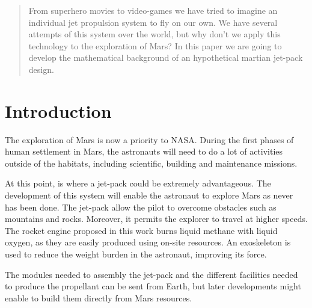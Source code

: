 \documentclass[twocolumn]{article}
\newcommand{\Mark}[1]{\textsuperscript{#1}}
\begin{document}
\clearpage

\thispagestyle{empty}
\phantom{asd}

\clearpage

\setcounter{page}{1}


\begin{abstract}
From superhero movies to video-games we have tried to imagine an individual jet 
propulsion system to fly on our own. We have several attempts of this system 
over the world, but why don't we apply this technology to the exploration of 
Mars? In this paper we are going to develop the mathematical background of an 
hypothetical martian jet-pack design. 
\end{abstract}

\section{Introduction}
The exploration of Mars is now a priority to NASA. During the first phases of 
human settlement in Mars, the astronauts will need to do a lot of activities
outside of the habitats, including scientific, building and maintenance 
missions.

At this point, is where a jet-pack could be extremely advantageous. The 
development of this system will enable the astronaut to explore Mars as never 
has been done. The jet-pack allow the pilot to overcome obstacles such as 
mountains and rocks. Moreover, it permits the explorer to travel at higher 
speeds. The rocket engine proposed in this work burns liquid methane with 
liquid oxygen, as they are easily produced using on-site resources. An 
exoskeleton is used to reduce the weight burden in the astronaut, improving its 
force.

The modules needed to assembly the jet-pack and the different facilities needed 
to produce the propellant can be sent from Earth, but later developments might 
enable to build them directly from Mars resources.
\end{document}
